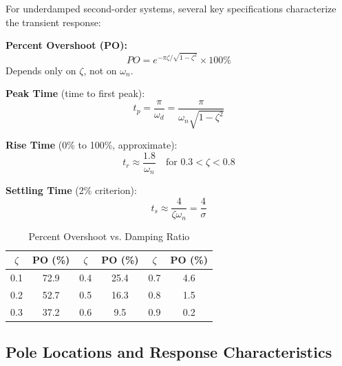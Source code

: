 For underdamped second-order systems, several key specifications characterize the transient response:

\begin{keyconceptbox}
\textbf{Percent Overshoot (PO):}
\begin{equation}
\boxed{PO = e^{-\pi\zeta/\sqrt{1-\zeta^2}} \times 100\%}
\label{eq:overshoot}
\end{equation}
Depends only on $\zeta$, not on $\omega_n$.

\textbf{Peak Time} (time to first peak):
\begin{equation}
\boxed{t_p = \frac{\pi}{\omega_d} = \frac{\pi}{\omega_n\sqrt{1-\zeta^2}}}
\label{eq:peak_time}
\end{equation}

\textbf{Rise Time} (0\% to 100\%, approximate):
\begin{equation}
\boxed{t_r \approx \frac{1.8}{\omega_n} \quad \text{for } 0.3 < \zeta < 0.8}
\label{eq:rise_time}
\end{equation}

\textbf{Settling Time} (2\% criterion):
\begin{equation}
\boxed{t_s \approx \frac{4}{\zeta\omega_n} = \frac{4}{\sigma}}
\label{eq:settling_time}
\end{equation}
\end{keyconceptbox}

\begin{table}[H]
\centering
\caption{Percent Overshoot vs. Damping Ratio}
\label{tab:overshoot}
\begin{tabular}{cc|cc|cc}
\toprule
$\zeta$ & PO (\%) & $\zeta$ & PO (\%) & $\zeta$ & PO (\%) \\
\midrule
0.1 & 72.9 & 0.4 & 25.4 & 0.7 & 4.6 \\
0.2 & 52.7 & 0.5 & 16.3 & 0.8 & 1.5 \\
0.3 & 37.2 & 0.6 & 9.5 & 0.9 & 0.2 \\
\bottomrule
\end{tabular}
\end{table}

\subsection{Pole Locations and Response Characteristics}

